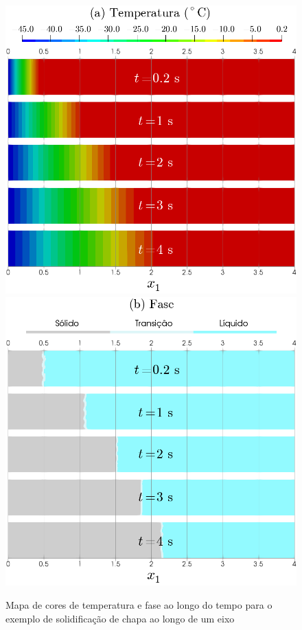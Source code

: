 \documentclass[Tese.tex]{subfiles}
\begin{document}
\begin{figure}[!htb]
	\centering
	\caption{Mapa de cores de temperatura e fase ao longo do tempo para o exemplo de solidificação de chapa ao longo de um eixo}
	\label{fig:phaseChange0-2}
	\includegraphics[scale=0.35]{Figuras/PhaseChange0/Paraview/Temperatura.png}\quad\includegraphics[scale=0.35]{Figuras/PhaseChange0/Paraview/Fase.png}
\end{figure}
\end{document}
